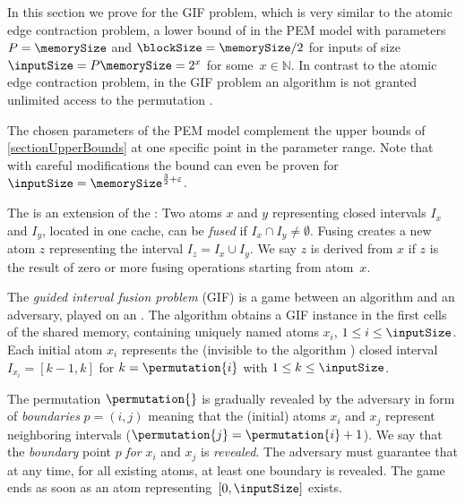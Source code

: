 \documentclass[envcountsame]{llncs}
\def\bOm#1{\printmath{\Omega \left(#1\right)}}
\begin{document}
\label{sectionIPNLB}




In this section we prove for the GIF problem, which is very similar to the atomic edge contraction problem, a lower bound  of \bOm{\log^2 \inputSize} in the PEM model with parameters $P=\memorySize$ and $\blockSize=\memorySize /2$ for inputs of size $\inputSize = P\memorySize=2^x$ for some~\mbox{$x\in\mathbb{N}$}. 
In contrast to the atomic edge contraction problem, in the GIF problem an algorithm is not granted unlimited access to the permutation \permutation{}.


The chosen parameters of the PEM model complement the upper bounds of \autoref{sectionUpperBounds} at one specific point in the parameter range.
Note that with careful modifications the \bOm{\log^2 \inputSize} bound can even be proven for $\inputSize =\memorySize^{\frac{3}{2}+\varepsilon}$.




\begin{definition}
The \emph{\fusePEM} is an extension of the \movePEM:
Two atoms $x$ and $y$ representing closed intervals $I_x$ and $I_y$, located in one cache, can be \emph{fused} if $I_x\cap I_y \neq \emptyset$.
Fusing creates a new atom $z$ representing the interval $I_z=I_x\cup I_y$. 
We say $z$ is derived from $x$ if $z$ is the result of zero or more fusing operations starting from atom~$x$.
\end{definition}

\begin{definition}
The \emph{guided interval fusion problem} (GIF) is a game between an algorithm and an adversary, played on an \fusePEM.
The algorithm obtains a GIF instance \gifInstance in the first  cells of the shared memory, containing  uniquely named atoms $x_i$, $1\leq i \leq\inputSize$.
Each initial atom $x_i$ represents the (invisible to the algorithm ) closed interval $I_{x_i}=[k-1,k]$ for $k=\permutation{i}$ with $1\leq k \leq \inputSize$.

The permutation $\permutation{}$ is gradually revealed by the adversary in form of \emph{boundaries} $p=(i,j)$ meaning that the (initial) atoms $x_i$ and $x_j$ represent neighboring intervals ($\permutation{j}=\permutation{i}+1$).
We say that the \emph{boundary} point $p$ \emph{for} $x_i$ and $x_j$ is \emph{revealed}. The adversary must guarantee that at any time, for all existing atoms, at least one boundary is revealed.
The game ends as soon as an atom representing~$[0,\inputSize]$ exists.
\end{definition}
\end{document}
